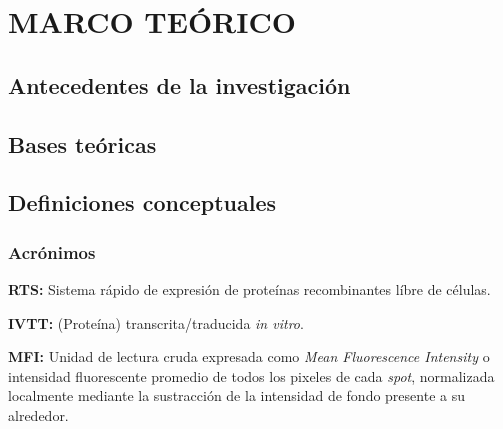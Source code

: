 \documentclass[]{article}
\begin{document}
\begin{table}[ht]
\begin{center}
\begin{tabular}{>{\centering}m{2.4cm} m{2.2cm}m{2.2cm}m{2cm}m{2.2cm}m{1.7cm}m{1.5cm}m{1.6cm} @{}m{0pt}@{} }


\end{tabular}
\hspace*{-1cm}
\end{center}
        \label{tab:opera}
\end{table}

\section{MARCO TEÓRICO}\label{marco-teorico}

\subsection{Antecedentes de la
investigación}\label{antecedentes-de-la-investigacion}

\subsection{Bases teóricas}\label{bases-teoricas}

\subsection{Definiciones conceptuales}\label{definiciones-conceptuales}

\subsubsection{Acrónimos}\label{acronimos}

\textbf{RTS:} Sistema rápido de expresión de proteínas recombinantes
líbre de células.

\textbf{IVTT:} (Proteína) transcrita/traducida \emph{in vitro}.

\textbf{MFI:} Unidad de lectura cruda expresada como \emph{Mean
Fluorescence Intensity} o intensidad fluorescente promedio de todos los
pixeles de cada \emph{spot}, normalizada localmente mediante la
sustracción de la intensidad de fondo presente a su alrededor.
\end{document}
